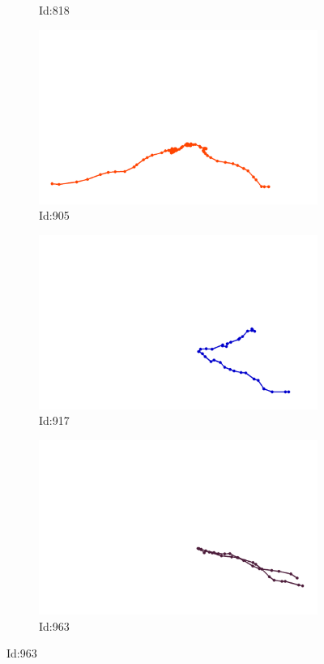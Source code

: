 \documentclass[12pt,twoside]{report}
\begin{document}
\begin{figure}
\begin{subfigure}[b]{0.20\textwidth}
\caption{Id:818}
\end{subfigure}
\begin{subfigure}[b]{0.20\textwidth}
\centering
\includegraphics[width=\textwidth]{../trajectories/905.png}
\caption{Id:905}
\end{subfigure}
\begin{subfigure}[b]{0.20\textwidth}
\centering
\includegraphics[width=\textwidth]{../trajectories/917.png}
\caption{Id:917}
\end{subfigure}
\begin{subfigure}[b]{0.20\textwidth}
\centering
\includegraphics[width=\textwidth]{../trajectories/963.png}
\caption{Id:963}
\end{subfigure}
\end{figure}
\end{document}
